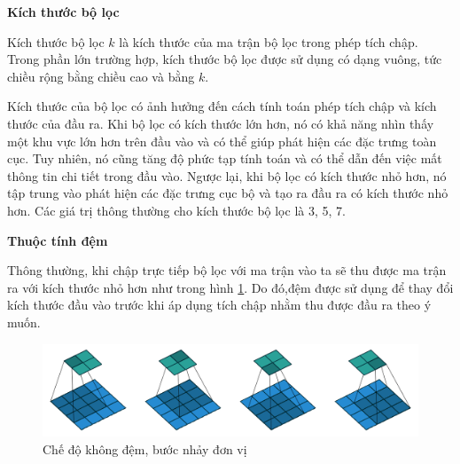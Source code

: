 \textbf{Kích thước bộ lọc}

Kích thước bộ lọc $k$ là kích thước của ma trận bộ lọc trong phép tích chập. Trong phần lớn trường hợp, kích thước bộ lọc được sử dụng có dạng vuông, tức chiều rộng bằng chiều cao và bằng $k$. 

Kích thước của bộ lọc có ảnh hưởng đến cách tính toán phép tích chập và kích thước của đầu ra. Khi bộ lọc có kích thước lớn hơn, nó có khả năng nhìn thấy một khu vực lớn hơn trên đầu vào và có thể giúp phát hiện các đặc trưng toàn cục. Tuy nhiên, nó cũng tăng độ phức tạp tính toán và có thể dẫn đến việc mất thông tin chi tiết trong đầu vào. Ngược lại, khi bộ lọc có kích thước nhỏ hơn, nó tập trung vào phát hiện các đặc trưng cục bộ và tạo ra đầu ra có kích thước nhỏ hơn. Các giá trị thông thường cho kích thước bộ lọc là 3, 5, 7.

\textbf{Thuộc tính đệm}

Thông thường, khi chập trực tiếp bộ lọc với ma trận vào ta sẽ thu được ma trận ra với kích thước nhỏ hơn như trong hình \ref{fig:no-padding-unit-stride}. Do đó,đệm được sử dụng để thay đổi kích thước đầu vào trước khi áp dụng tích chập nhằm thu được đầu ra theo ý muốn.

\begin{figure}[h]
	\centering
	\includegraphics[width=0.9\linewidth]{images/no-padding-unit-stride}
	\caption{Chế độ không đệm, bước nhảy đơn vị}
	\label{fig:no-padding-unit-stride}
\end{figure}

